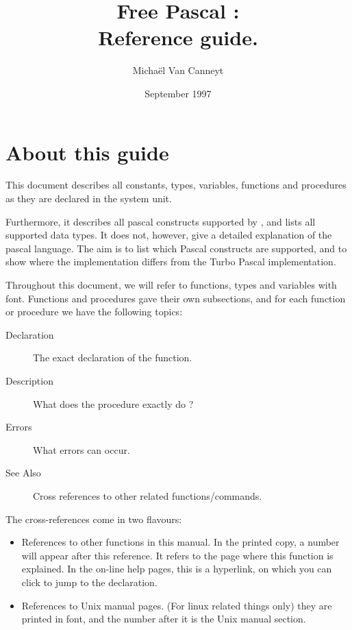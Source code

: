 \documentclass{report}
\begin{document}
\title{Free Pascal :\\ Reference guide.}
\date{September 1997}
\author{Micha\"el Van Canneyt
}
\maketitle
\tableofcontents
\newpage
\listoftables
\newpage
\section*{About this guide}
This document describes all constants, types, variables, functions and
procedures as they are declared in the system unit.

Furthermore, it describes all pascal constructs supported by \fpk, and lists
all supported data types. It does not, however, give a detailed explanation
of the pascal language. The aim is to list which Pascal constructs are
supported, and to show where the \fpk implementation differs from the
Turbo Pascal implementation.

Throughout this document, we will refer to functions, types and variables
with  font. Functions and procedures gave their own
subsections, and for each function or procedure we have the following 
topics:
\begin{description}
\item [Declaration] The exact declaration of the function.
\item [Description] What does the procedure exactly do ?
\item [Errors] What errors can occur.
\item [See Also] Cross references to other related functions/commands.
\end{description}
The cross-references come in two flavours:
\begin{itemize}
\item References to other functions in this manual. In the printed copy, a
number will appear after this reference. It refers to the page where this
function is explained. In the on-line help pages, this is a hyperlink, on
which you can click to jump to the declaration.
\item References to Unix manual pages. (For linux related things only) they
are printed in  font, and the number after it is the Unix
manual section.
\end{itemize}
%
%
\end{document}
